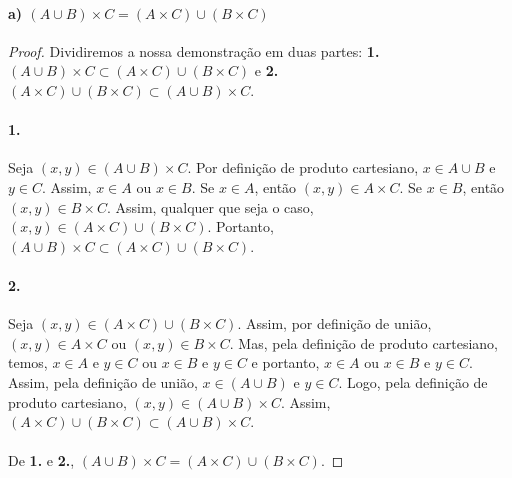 \documentclass[9pt,twocolumn,a4paper]{article}
\begin{document}
    \paragraph{a) $(A \cup B) \times C = (A \times C) \cup (B \times C)$}
    \begin{proof}
    Dividiremos a nossa demonstração em duas partes: \textbf{1.} $(A \cup B) \times C \subset (A \times C) \cup (B \times C)$ e \textbf{2.} $(A \times C) \cup (B \times C) \subset (A \cup B) \times C$.

    \paragraph{1.}
    Seja $(x, y) \in (A \cup B) \times C$. Por definição de produto cartesiano, $x \in A \cup B$ e $y \in C$. Assim, $x \in A$ ou $x \in B$. Se $x \in A$, então $(x, y) \in A \times C$. Se $x \in B$, então $(x, y) \in B \times C$. Assim, qualquer que seja o caso, $(x, y) \in (A \times C) \cup (B \times C)$. Portanto, $(A \cup B) \times C \subset (A \times C) \cup (B \times C)$.

    \paragraph{2.}
    Seja $(x, y) \in (A \times C) \cup (B \times C)$. Assim, por definição de união, $(x, y) \in A \times C$ ou $(x, y) \in B \times C$. Mas, pela definição de produto cartesiano, temos, $x \in A$ e $y \in C$ ou $x \in B$ e $y \in C$ e portanto, $x \in A$ ou $x \in B$ e $y \in C$. Assim, pela definição de união, $x \in (A \cup B)$ e $y \in C$. Logo, pela definição de produto cartesiano, $(x, y) \in (A \cup B) \times C$. Assim, $(A \times C) \cup (B \times C) \subset (A \cup B) \times C$.
    
    \paragraph{}
    De \textbf{1.} e \textbf{2.}, $(A \cup B) \times C = (A \times C) \cup (B \times C)$.
    \end{proof}
\end{document}
